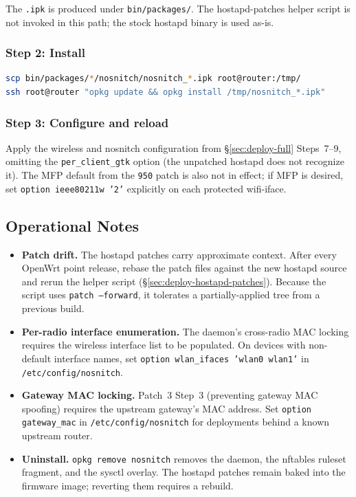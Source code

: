 \noindent The \texttt{.ipk} is produced under \texttt{bin/packages/}.
The hostapd-patches helper script is not invoked in this path; the
stock hostapd binary is used as-is.

\subsubsection{Step 2: Install}

\begin{lstlisting}[language=bash]
scp bin/packages/*/nosnitch/nosnitch_*.ipk root@router:/tmp/
ssh root@router "opkg update && opkg install /tmp/nosnitch_*.ipk"
\end{lstlisting}

\subsubsection{Step 3: Configure and reload}

Apply the wireless and nosnitch configuration from
\S\ref{sec:deploy-full} Steps~7--9, omitting the
\texttt{per\_client\_gtk} option (the unpatched hostapd does not
recognize it). The MFP default from the \texttt{950} patch is also not
in effect; if MFP is desired, set \texttt{option ieee80211w '2'}
explicitly on each protected wifi-iface.

\subsection{Operational Notes}

\begin{itemize}
  \item \textbf{Patch drift.} The hostapd patches carry approximate
  context. After every OpenWrt point release, rebase the patch files
  against the new hostapd source and rerun the helper script
  (\S\ref{sec:deploy-hostapd-patches}). Because the script uses
  \texttt{patch~--forward}, it tolerates a partially-applied tree from
  a previous build.
  \item \textbf{Per-radio interface enumeration.} The daemon's
  cross-radio MAC locking requires the wireless interface list to be
  populated. On devices with non-default interface names, set
  \texttt{option wlan\_ifaces 'wlan0 wlan1'} in
  \texttt{/etc/config/nosnitch}.
  \item \textbf{Gateway MAC locking.} Patch~3 Step~3 (preventing
  gateway MAC spoofing) requires the upstream gateway's MAC address.
  Set \texttt{option gateway\_mac} in \texttt{/etc/config/nosnitch} for
  deployments behind a known upstream router.
  \item \textbf{Uninstall.} \texttt{opkg remove nosnitch} removes the
  daemon, the nftables ruleset fragment, and the sysctl overlay. The
  hostapd patches remain baked into the firmware image; reverting
  them requires a rebuild.
\end{itemize}
